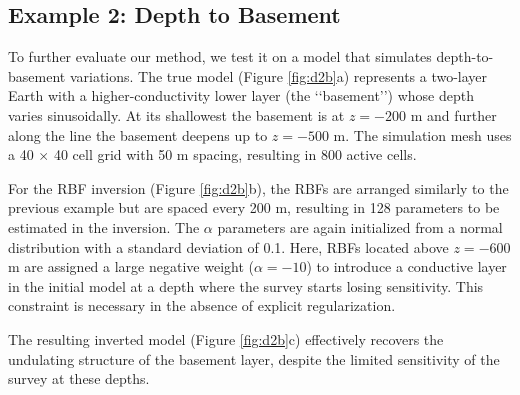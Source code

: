 \documentclass{segabs}
\begin{document}
\subsection{Example 2: Depth to Basement}
\vspace{-0.4cm}

To further evaluate our method, we test it on a model that simulates depth-to-basement variations. The true model (Figure \ref{fig:d2b}a) represents a two-layer Earth with a higher-conductivity lower layer (the \lq\lq basement\rq\rq) whose depth varies sinusoidally. At its shallowest the basement is at $z=-200$ m and further along the line the basement deepens up to $z=-500$ m. The simulation mesh uses a 40 $\times$ 40 cell grid with 50 m spacing, resulting in 800 active cells.

For the RBF inversion (Figure \ref{fig:d2b}b), the RBFs are arranged similarly to the previous example but are spaced every 200 m, resulting in 128 parameters to be estimated in the inversion. The $\alpha$ parameters are again initialized from a normal distribution with a standard deviation of 0.1. Here, RBFs located above $z = -600$ m are assigned a large negative weight ($\alpha = -10$) to introduce a conductive layer in the initial model at a depth where the survey starts losing sensitivity. This constraint is necessary in the absence of explicit regularization. 

The resulting inverted model (Figure \ref{fig:d2b}c) effectively recovers the undulating structure of the basement layer, despite the limited sensitivity of the survey at these depths.
\end{document}
